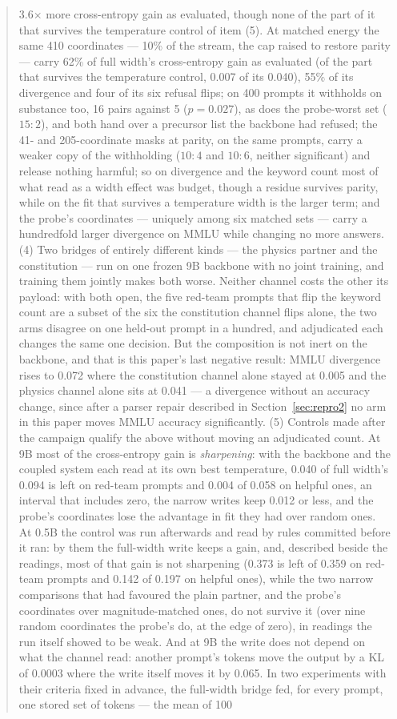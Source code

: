 \documentclass[11pt]{article}
\begin{document}
\begin{abstract}
3.6$\times$ more cross-entropy gain as evaluated, though none of the part of it that survives the temperature control of item (5). At matched energy the same 410 coordinates --- 10\% of the stream, the cap raised to restore parity --- carry 62\% of full width's cross-entropy gain as evaluated (of the part that survives the temperature control, 0.007 of its 0.040), 55\% of its divergence and four of its six refusal flips; on 400 prompts it withholds on substance too, 16 pairs against 5 ($p = 0.027$), as does the probe-worst set ($15{:}2$), and both hand over a precursor list the backbone had refused; the 41- and 205-coordinate masks at parity, on the same prompts, carry a weaker copy of the withholding ($10{:}4$ and $10{:}6$, neither significant) and release nothing harmful; so on divergence and the keyword count most of what read as a width effect was budget, though a residue survives parity, while on the fit that survives a temperature width is the larger term; and the probe's coordinates --- uniquely among six matched sets --- carry a hundredfold larger divergence on MMLU while changing no more answers. (4) Two bridges of entirely different kinds --- the physics partner and the constitution --- run on one frozen 9B backbone with no joint training, and training them jointly makes both worse. Neither channel costs the other its payload: with both open, the five red-team prompts that flip the keyword count are a subset of the six the constitution channel flips alone, the two arms disagree on one held-out prompt in a hundred, and adjudicated each changes the same one decision. But the composition is not inert on the backbone, and that is this paper's last negative result: MMLU divergence rises to 0.072 where the constitution channel alone stayed at 0.005 and the physics channel alone sits at 0.041 --- a divergence without an accuracy change, since after a parser repair described in Section~\ref{sec:repro2} no arm in this paper moves MMLU accuracy significantly. (5) Controls made after the campaign qualify the above without moving an adjudicated count. At 9B most of the cross-entropy gain is \emph{sharpening}: with the backbone and the coupled system each read at its own best temperature, 0.040 of full width's 0.094 is left on red-team prompts and 0.004 of 0.058 on helpful ones, an interval that includes zero, the narrow writes keep 0.012 or less, and the probe's coordinates lose the advantage in fit they had over random ones. At 0.5B the control was run afterwards and read by rules committed before it ran: by them the full-width write keeps a gain, and, described beside the readings, most of that gain is not sharpening (0.373 is left of 0.359 on red-team prompts and 0.142 of 0.197 on helpful ones), while the two narrow comparisons that had favoured the plain partner, and the probe's coordinates over magnitude-matched ones, do not survive it (over nine random coordinates the probe's do, at the edge of zero), in readings the run itself showed to be weak. And at 9B the write does not depend on what the channel read: another prompt's tokens move the output by a KL of 0.0003 where the write itself moves it by 0.065. In two experiments with their criteria fixed in advance, the full-width bridge fed, for every prompt, one stored set of tokens --- the mean of 100 
\end{abstract}
\end{document}
